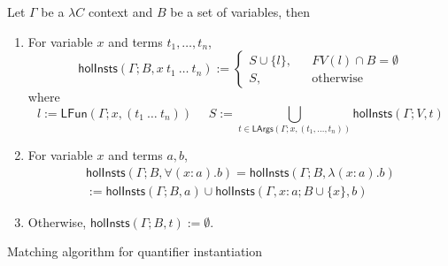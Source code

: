 \begin{definition}
  Let $\Gamma$ be a $\lambda C$ context and $B$ be a set of variables, then
  \begin{enumerate}
    \item For variable $x$ and terms $t_1, \dots, t_n$,
      $$\mathsf{holInsts}(\Gamma; B, x \ t_1 \ \dots \ t_n) := \left\{
        \begin{aligned}
          S \cup \{l\}, & & FV(l) \cap B = \emptyset \\
          S, & & \text{otherwise}
        \end{aligned}
      \right.$$
      where
      $$l := \mathsf{LFun}(\Gamma; x, (t_1 \ \dots \ t_n)) \ \ \ \ \ \ S := \bigcup_{t \in \mathsf{LArgs}(\Gamma; x, (t_1, \dots, t_n))} \mathsf{holInsts}(\Gamma; V, t)$$
    \item For variable $x$ and terms $a, b$,
      \begin{align*}
        \mathsf{holInsts}(\Gamma; B, \forall (x : a). b) = \mathsf{holInsts}(\Gamma; B, \lambda (x : a). b) 
        \\ := \mathsf{holInsts}(\Gamma; B, a) \cup \mathsf{holInsts}(\Gamma, x : a; B \cup \{x\}, b)
      \end{align*}
    \item Otherwise, $\mathsf{holInsts}(\Gamma; B, t) := \emptyset$.
  \end{enumerate}
\end{definition}

\begin{algorithm}\label{matching}
  \DontPrintSemicolon
  \SetNoFillComment
  \caption{Matching algorithm for quantifier instantiation}
\end{algorithm}


